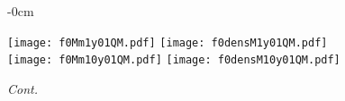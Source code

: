 \documentclass[universe,article,accept,moreauthors,pdftex]{Definitions/mdpi}
\begin{document}
\begin{figure}[H]

\begin{adjustwidth}{-\extralength}{0cm}
\centering %

{\texttt{[image: f0Mm1y01QM.pdf]}\vspace{3pt}
	  \texttt{[image: f0densM1y01QM.pdf]}}\\\vspace{5pt}
{\texttt{[image: f0Mm10y01QM.pdf]}\vspace{3pt}
	  \texttt{[image: f0densM10y01QM.pdf]}}\\
\end{adjustwidth}
\caption{\emph{Cont.}}
\label{fig:f0Mdens01QM}

\end{figure}
\end{document}
